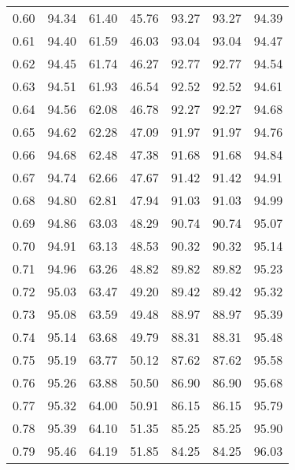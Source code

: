 \begin{tabular}{|c|c|c|c|c|c|c|}
      0.60 &     94.34 &     61.40 &      45.76 &   93.27 &      93.27 &         94.39 \\
      0.61 &     94.40 &     61.59 &      46.03 &   93.04 &      93.04 &         94.47 \\
      0.62 &     94.45 &     61.74 &      46.27 &   92.77 &      92.77 &         94.54 \\
      0.63 &     94.51 &     61.93 &      46.54 &   92.52 &      92.52 &         94.61 \\
      0.64 &     94.56 &     62.08 &      46.78 &   92.27 &      92.27 &         94.68 \\
      0.65 &     94.62 &     62.28 &      47.09 &   91.97 &      91.97 &         94.76 \\
      0.66 &     94.68 &     62.48 &      47.38 &   91.68 &      91.68 &         94.84 \\
      0.67 &     94.74 &     62.66 &      47.67 &   91.42 &      91.42 &         94.91 \\
      0.68 &     94.80 &     62.81 &      47.94 &   91.03 &      91.03 &         94.99 \\
      0.69 &     94.86 &     63.03 &      48.29 &   90.74 &      90.74 &         95.07 \\
      0.70 &     94.91 &     63.13 &      48.53 &   90.32 &      90.32 &         95.14 \\
      0.71 &     94.96 &     63.26 &      48.82 &   89.82 &      89.82 &         95.23 \\
      0.72 &     95.03 &     63.47 &      49.20 &   89.42 &      89.42 &         95.32 \\
      0.73 &     95.08 &     63.59 &      49.48 &   88.97 &      88.97 &         95.39 \\
      0.74 &     95.14 &     63.68 &      49.79 &   88.31 &      88.31 &         95.48 \\
      0.75 &     95.19 &     63.77 &      50.12 &   87.62 &      87.62 &         95.58 \\
      0.76 &     95.26 &     63.88 &      50.50 &   86.90 &      86.90 &         95.68 \\
      0.77 &     95.32 &     64.00 &      50.91 &   86.15 &      86.15 &         95.79 \\
      0.78 &     95.39 &     64.10 &      51.35 &   85.25 &      85.25 &         95.90 \\
      0.79 &     95.46 &     64.19 &      51.85 &   84.25 &      84.25 &         96.03 \\

\end{tabular}
